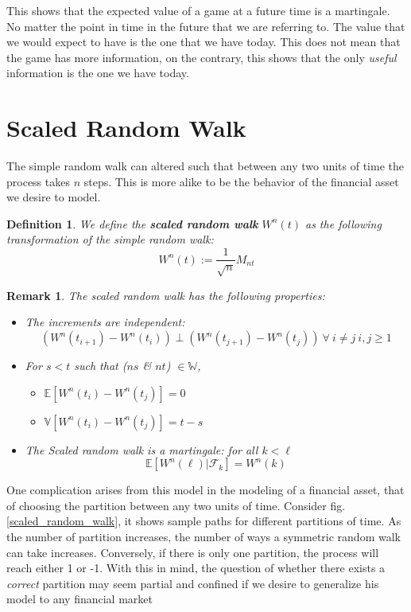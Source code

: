 \documentclass[11pt]{report}
\newtheorem{definition}{Definition}[chapter]
\newtheorem{remark}{Remark}[chapter]
\newcommand{\salgF}{\mathscr{F}}
\begin{document}
This shows that the expected value of a game at a future time is a martingale. No matter the point in time in the future that we are referring to. The value that we would expect to have is the one that we have today. This does not mean that the game has more information, on the contrary, this shows that the only \textit{useful} information is the one we have today. \\


\section{Scaled Random Walk}
The simple random walk can altered such that between any two units of time the process takes $n$ steps. This is more alike to be the behavior of the financial asset we desire to model. 

\begin{definition}
	We define the \textbf{scaled random walk} $W^n(t)$ as the following transformation of the simple random walk:
	\[W^n(t) := \frac{1}{\sqrt{n}}M_{nt}\]
\end{definition}

\begin{remark}
	The scaled random walk has the following properties:
	\begin{itemize}
		\item The increments are independent: \[\left(W^n(t_{i+1}) - W^n(t_{i})\right) \perp \left(W^n(t_{j+1}) - W^n(t_{j})\right) \ \forall \ i \neq j \ i, j \geq 1\]
		\item For $s < t$ such that ($ns$ \& $nt$) $\in \mathbb{W}$, 
		\begin{itemize}
			\item $\mathbb{E}[W^n(t_{i}) - W^n(t_{j})] = 0$ 
			\item $\mathbb{V}[W^n(t_{i}) - W^n(t_{j})] = t - s$
		\end{itemize}
		\item The Scaled random walk is a martingale: for all $k < \ell$
		\[\mathbb{E}[W^n(\ell) | \salgF_k] = W^n(k)\]
	\end{itemize}
\end{remark}

One complication arises from this model in the modeling of a financial asset, that of choosing the partition between any two units of time. Consider fig. \ref{scaled_random_walk}, it shows sample paths for different partitions of time. As the number of partition increases, the number of ways a symmetric random walk can take increases. Conversely, if there is only one partition, the process will reach either 1 or -1. With this in mind, the question of whether there exists a \textit{correct} partition may seem partial and confined if we desire to generalize his model to any financial market\\
\end{document}
